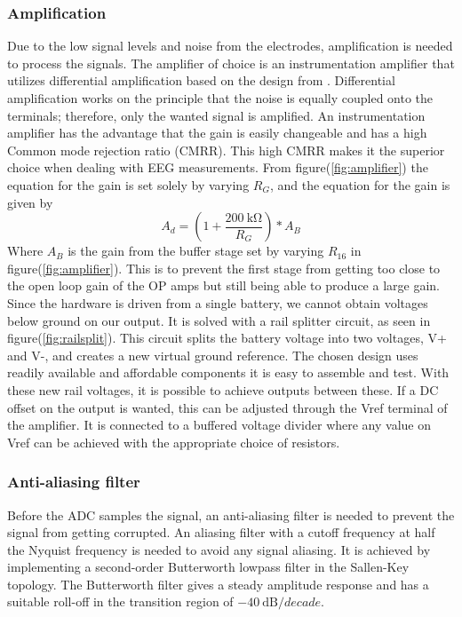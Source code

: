 \subsubsection{Amplification}
Due to the low signal levels and noise from the electrodes, amplification is needed to process the signals. The amplifier of choice is an instrumentation amplifier that utilizes differential amplification based on the design from \cite{EEamp}. Differential amplification works on the principle that the noise is equally coupled onto the terminals; therefore, only the wanted signal is amplified. An instrumentation amplifier has the advantage that the gain is easily changeable and has a high Common mode rejection ratio (CMRR). This high CMRR makes it the superior choice when dealing with EEG measurements. From figure(\ref{fig:amplifier}) the equation for the gain is set solely by varying $R_G
$, and the equation for the gain is given by
\begin{equation}
    A_d=(1+\dfrac{\SI{200}{\kilo\ohm}}{R_G})*A_{B}
\end{equation}
 Where $A_{B}$ is the gain from the buffer stage set by varying $R_{16}$ in figure(\ref{fig:amplifier}). This is to prevent the first stage from getting too close to the open loop gain of the OP amps but still being able to produce a large gain. Since the hardware is driven from a single battery, we cannot obtain voltages below ground on our output. It is solved with a rail splitter circuit, as seen in figure(\ref{fig:railsplit}). This circuit splits the battery voltage into two voltages, V+ and V-, and creates a new virtual ground reference. The chosen design uses readily available and affordable components it is easy to assemble and test. With these new rail voltages, it is possible to achieve outputs between these. If a DC offset on the output is wanted, this can be adjusted through the Vref terminal of the amplifier. It is connected to a buffered voltage divider where any value on Vref can be achieved with the appropriate choice of resistors.
\subsubsection{Anti-aliasing filter}
Before the ADC samples the signal, an anti-aliasing filter is needed to prevent the signal from getting corrupted. An aliasing filter with a cutoff frequency at half the Nyquist frequency is needed to avoid any signal aliasing. It is achieved by implementing a second-order Butterworth lowpass filter in the Sallen-Key topology. The Butterworth filter gives a steady amplitude response and has a suitable roll-off in the transition region of $\SI{-40}{\deci\bel}/decade$. 

